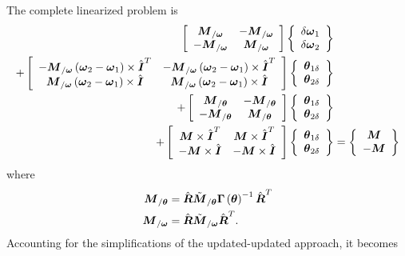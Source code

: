 \documentclass[10pt,dvips,fleqn]{report}
\newcommand{\T}[1]{\boldsymbol{#1}}
\begin{document}
The complete linearized problem is
\begin{align}
	\sqbr{\matr{cc}{
		\T{M}_{/\T{\omega}} & - \T{M}_{/\T{\omega}} \\
		- \T{M}_{/\T{\omega}} & \T{M}_{/\T{\omega}}
	}} \cubr{\cvvect{
		\delta\T{\omega}_1 \\
		\delta\T{\omega}_2
	}} & \nonumber \\
	+ \sqbr{\matr{cc}{
		- \T{M}_{/\T{\omega}} \plbr{\T{\omega}_2 - \T{\omega}_1}\times \hat{\T{I}}^T
			& - \T{M}_{/\T{\omega}} \plbr{\T{\omega}_2 - \T{\omega}_1}\times \hat{\T{I}}^T \\
		\T{M}_{/\T{\omega}} \plbr{\T{\omega}_2 - \T{\omega}_1}\times \hat{\T{I}}
			& \T{M}_{/\T{\omega}} \plbr{\T{\omega}_2 - \T{\omega}_1}\times \hat{\T{I}}
	}} \cubr{\cvvect{
		\T{\theta}_{1\delta} \\
		\T{\theta}_{2\delta}
	}} & \nonumber \\
	+ \sqbr{\matr{cc}{
		\T{M}_{/\T{\theta}} & - \T{M}_{/\T{\theta}} \\
		- \T{M}_{/\T{\theta}} & \T{M}_{/\T{\theta}}
	}} \cubr{\cvvect{
		\T{\theta}_{1\delta} \\
		\T{\theta}_{2\delta}
	}} & \nonumber \\
	+ \sqbr{\matr{cc}{
		\T{M} \times \hat{\T{I}}^T & \T{M} \times \hat{\T{I}}^T \\
		- \T{M} \times \hat{\T{I}} & - \T{M} \times \hat{\T{I}}
	}} \cubr{\cvvect{
		\T{\theta}_{1\delta} \\
		\T{\theta}_{2\delta}
	}} &= \cubr{\cvvect{
		\T{M} \\
		- \T{M}
	}}
\end{align}
where
\begin{align}
	\T{M}_{/\T{\theta}} &= \hat{\T{R}} \tilde{\T{M}}_{/\T{\theta}} \T{\Gamma}\plbr{\T{\theta}}^{-1} \hat{\T{R}}^T \\
	\T{M}_{/\T{\omega}} &= \hat{\T{R}} \tilde{\T{M}}_{/\T{\omega}} \hat{\T{R}}^T .
\end{align}
Accounting for the simplifications of the updated-updated approach, it becomes
\end{document}
